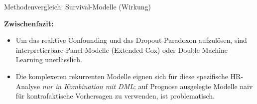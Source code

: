 \documentclass[12pt]{beamer}
\begin{document}
\begin{frame}{Methodenvergleich: Survival-Modelle (Wirkung)}
    \vspace{0.2cm}
    \begin{table}[]
        \centering
    \end{table}
    
\textbf{Zwischenfazit:}
    \begin{itemize}
        \item Um das reaktive Confounding und das Dropout-Paradoxon aufzulösen, sind interpretierbare Panel-Modelle (Extended Cox) oder Double Machine Learning unerlässlich. 
	\item Die komplexeren rekurrenten Modelle eignen sich für diese spezifische HR-Analyse \textit{nur in Kombination mit DML}; auf Prognose ausgelegte Modelle naiv für kontrafaktische Vorhersagen zu verwenden, ist problematisch.
    \end{itemize}
\end{frame}
\end{document}
